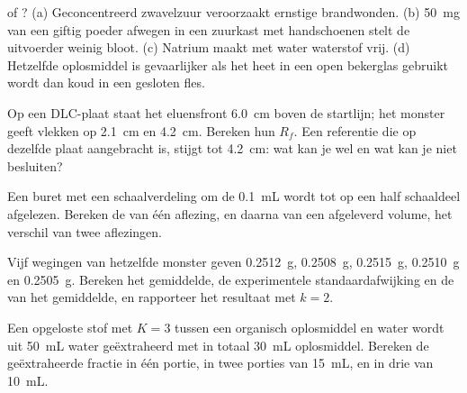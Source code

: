 \begin{exercise}[$\star$]\label{exo:b1:lab-techniques-1:2}
 of ? (a) Geconcentreerd zwavelzuur veroorzaakt ernstige
brandwonden. (b) \qty{50}{mg} van een giftig poeder afwegen in een
zuurkast met handschoenen stelt de uitvoerder weinig bloot. (c) Natrium
maakt met water waterstof vrij. (d) Hetzelfde oplosmiddel is gevaarlijker
als het heet in een open bekerglas gebruikt wordt dan koud in een
gesloten fles.
\end{exercise}

\begin{exercise}[$\star$]\label{exo:b1:lab-techniques-1:3}
Op een DLC-plaat staat het eluensfront \qty{6.0}{cm} boven de startlijn;
het monster geeft vlekken op \qty{2.1}{cm} en \qty{4.2}{cm}. Bereken hun
$R_f$. Een referentie die op dezelfde plaat aangebracht is, stijgt tot
\qty{4.2}{cm}: wat kan je wel en wat kan je niet besluiten?
\end{exercise}

\begin{exercise}[$\star$]\label{exo:b1:lab-techniques-1:4}
Een buret met een schaalverdeling om de \qty{0.1}{mL} wordt tot op een
half schaaldeel afgelezen. Bereken de  van één
aflezing, en daarna van een afgeleverd volume, het verschil van twee
aflezingen.
\end{exercise}

\begin{exercise}[$\star\star$]\label{exo:b1:lab-techniques-1:5}
Vijf wegingen van hetzelfde monster geven \qty{0.2512}{g},
\qty{0.2508}{g}, \qty{0.2515}{g}, \qty{0.2510}{g} en \qty{0.2505}{g}.
Bereken het gemiddelde, de experimentele standaardafwijking en de
 van het gemiddelde, en rapporteer het resultaat met
$k = 2$.
\end{exercise}

\begin{exercise}[$\star\star$]\label{exo:b1:lab-techniques-1:6}
Een opgeloste stof met  $K = 3$ tussen een
organisch oplosmiddel en water wordt uit \qty{50}{mL} water geëxtraheerd
met in totaal \qty{30}{mL} oplosmiddel. Bereken de geëxtraheerde fractie
in één portie, in twee porties van \qty{15}{mL}, en in drie van
\qty{10}{mL}.
\end{exercise}

